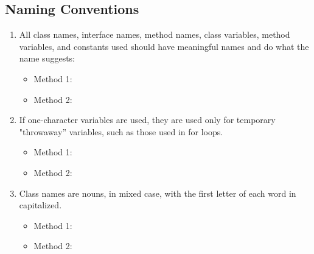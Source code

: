 \subsection{Naming Conventions}
\begin{enumerate}
\setcounter{enumi}{0}
	\item All class names, interface names, method names, class variables, method variables, and constants used should have meaningful names and do what the name suggests:
	\begin{itemize}
	 	\item Method 1: \cmark
		 \item Method 2: 
	\end{itemize}
	\item If one-character variables are used, they are used only for temporary "throwaway” variables, such as those used in for loops.
	\begin{itemize}
	 	\item Method 1: \cmark
	 \item Method 2: 
	\end{itemize}
	\item Class names are nouns, in mixed case, with the first letter of each word in capitalized.
	\begin{itemize}
	 	\item Method 1: \cmark
 		\item Method 2: 
	\end{itemize}
\end{enumerate}
